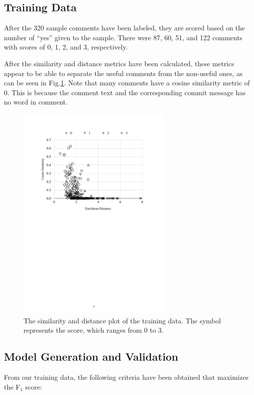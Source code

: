 \documentclass[conference]{IEEEtran}
\begin{document}
\subsection{Training Data}

After the 320 sample comments have been labeled,
they are scored based on the number of ``yes'' given to the sample.
There were 87, 60, 51, and 122 comments with scores of 0, 1, 2, and 3, respectively.

After the similarity and distance metrics have been calculated,
these metrics appear to be able to separate the useful comments from the non-useful ones,
as can be seen in Fig.\ref{fig:scatter}.
Note that many comments have a cosine similarity metric of 0.
This is because the comment text and the corresponding commit message has no word in comment.

\begin{figure}[h]
\centering
\includegraphics[width=3in]{scatter}
\caption{The similarity and distance plot of the training data.
The symbol represents the score, which ranges from 0 to 3.}
\label{fig:scatter}
\end{figure}



\subsection{Model Generation and Validation}

From our training data,
the following criteria have been obtained that maximizes the F$_1$ score:
\end{document}
